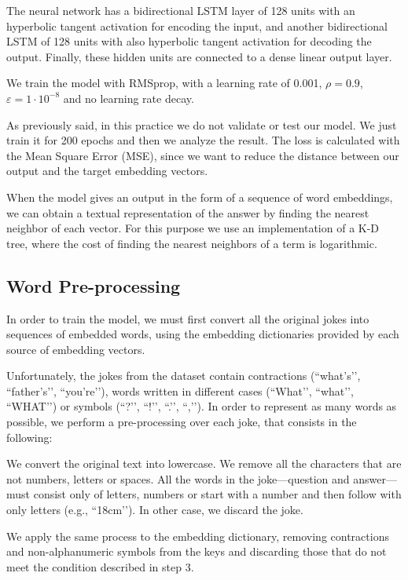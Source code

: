 \documentclass[]{article}
\begin{document}
	The neural network has a bidirectional LSTM layer of 128 units with an hyperbolic tangent activation for encoding the input, and another bidirectional LSTM of 128 units with also hyperbolic tangent activation for decoding the output. Finally, these hidden units are connected to a dense linear output layer.
	
	We train the model with RMSprop, with a learning rate of 0.001, $ \rho = 0.9 $, $ \varepsilon = 1 \cdot 10^{-8} $ and no learning rate decay.
	
	As previously said, in this practice we do not validate or test our model. We just train it for 200 epochs and then we analyze the result. The loss is calculated with the Mean Square Error (MSE), since we want to reduce the distance between our output and the target embedding vectors.
	
	When the model gives an output in the form of a sequence of word embeddings, we can obtain a textual representation of the answer by finding the nearest neighbor of each vector. For this purpose we use an implementation of a K-D tree, where the cost of finding the nearest neighbors of a term is logarithmic.
	
	\subsection{Word Pre-processing}
	
	In order to train the model, we must first convert all the original jokes into sequences of embedded words, using the embedding dictionaries provided by each source of embedding vectors.
	
	Unfortunately, the jokes from the dataset contain contractions (``what’s’’, ``father’s’’, ``you’re’’), words written in different cases (``What’’, ``what’’, ``WHAT’’) or symbols (``?’’, ``!’’, ``.’’, ``,’’). In order to represent as many words as possible, we perform a pre-processing over each joke, that consists in the following:
	
	We convert the original text into lowercase.
	We remove all the characters that are not numbers, letters or spaces.
	All the words in the joke---question and answer---must consist only of letters, numbers or start with a number and then follow with only letters (e.g., ``18cm’’). In other case, we discard the joke.
	
	We apply the same process to the embedding dictionary, removing contractions and non-alphanumeric symbols from the keys and discarding those that do not meet the condition described in step 3.
	
\end{document}
